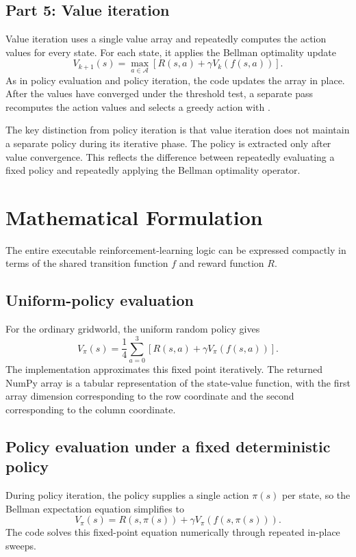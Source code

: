 \documentclass[11pt,a4paper]{article}
\newcommand{\code}[1]{\texttt{\detokenize{#1}}}
\begin{document}
\subsection{Part 5: Value iteration}
Value iteration uses a single value array and repeatedly computes the action values for every state. For each state, it applies the Bellman optimality update
\begin{equation}
V_{k+1}(s)
=
\max_{a\in\mathcal{A}}
\left[R(s,a)+\gamma V_k(f(s,a))\right].
\end{equation}
As in policy evaluation and policy iteration, the code updates the array in place. After the values have converged under the threshold test, a separate pass recomputes the action values and selects a greedy action with \code{np.argmax}.

The key distinction from policy iteration is that value iteration does not maintain a separate policy during its iterative phase. The policy is extracted only after value convergence. This reflects the difference between repeatedly evaluating a fixed policy and repeatedly applying the Bellman optimality operator.

\section{Mathematical Formulation}
The entire executable reinforcement-learning logic can be expressed compactly in terms of the shared transition function \(f\) and reward function \(R\).

\subsection{Uniform-policy evaluation}
For the ordinary gridworld, the uniform random policy gives
\begin{equation}
V_\pi(s)
=\frac{1}{4}
\sum_{a=0}^{3}
\left[R(s,a)+\gamma V_\pi(f(s,a))\right].
\end{equation}
The implementation approximates this fixed point iteratively. The returned NumPy array is a tabular representation of the state-value function, with the first array dimension corresponding to the row coordinate and the second corresponding to the column coordinate.

\subsection{Policy evaluation under a fixed deterministic policy}
During policy iteration, the policy supplies a single action \(\pi(s)\) per state, so the Bellman expectation equation simplifies to
\begin{equation}
V_\pi(s)
=R(s,\pi(s))+
\gamma V_\pi(f(s,\pi(s))).
\end{equation}
The code solves this fixed-point equation numerically through repeated in-place sweeps.
\end{document}
